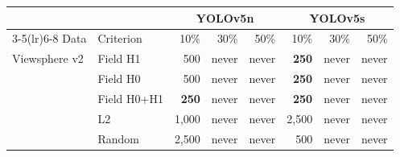 \begin{tabular}{llrrrrrr}
\toprule
 & & \multicolumn{3}{c}{YOLOv5n} & \multicolumn{3}{c}{YOLOv5s} \\
\cmidrule(lr){3-5}\cmidrule(lr){6-8}
Data & Criterion & 10\% & 30\% & 50\% & 10\% & 30\% & 50\% \\
\midrule
Viewsphere v2 & Field H1 & 500 & never & never & \textbf{250} & never & never \\
 & Field H0 & 500 & never & never & \textbf{250} & never & never \\
 & Field H0+H1 & \textbf{250} & never & never & \textbf{250} & never & never \\
 & L2 & 1,000 & never & never & 2,500 & never & never \\
 & Random & 2,500 & never & never & 500 & never & never \\
\bottomrule
\end{tabular}
